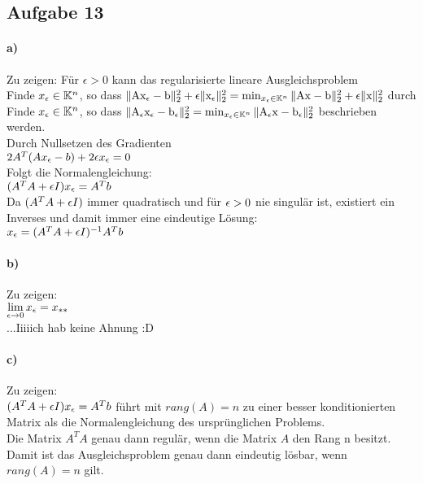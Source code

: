 \subsection*{Aufgabe 13}

\paragraph*{a)}
Zu zeigen: Für $\epsilon > 0$ kann das regularisierte lineare Ausgleichsproblem\\
\newline
Finde $x_\epsilon \in \mathbb K^n$, so dass $\mathrm{\| Ax_\epsilon - b \|_2^2} + \epsilon\mathrm{\| x_\epsilon \|_2^2} = \min_{x_\epsilon \in \mathbb K^n}\mathrm{\| Ax - b \|_2^2} + \epsilon\mathrm{\| x \|_2^2}$ durch\\
\newline
Finde $x_\epsilon \in \mathbb K^n$, so dass $\mathrm{\| A_\epsilon x_\epsilon - b_\epsilon \|_2^2} = \min_{x_\epsilon \in \mathbb K^n}\mathrm{\| A_\epsilon x - b_\epsilon \|_2^2}$ beschrieben werden.\\
\newline
Durch Nullsetzen des Gradienten\\
$2A^T(Ax_\epsilon-b)+2\epsilon x_\epsilon = 0$\\
Folgt die Normalengleichung:\\
$(A^TA + \epsilon I)x_\epsilon = A^Tb$\\

Da $(A^TA + \epsilon I)$ immer quadratisch und für $\epsilon > 0$ nie singulär ist, existiert ein Inverses und damit immer eine eindeutige Lösung:\\
$x_\epsilon = (A^TA + \epsilon I)^{-1}A^Tb$


\paragraph*{b)}
Zu zeigen:\\
$\lim\limits_{\epsilon \rightarrow 0}{x_\epsilon} = x_{**}$\\
\newline
...Iiiiich hab keine Ahnung :D



\paragraph*{c)}
Zu zeigen:\\
$(A^TA + \epsilon I)x_\epsilon = A^Tb$ führt mit $rang(A) = n$ zu einer besser konditionierten Matrix als die Normalengleichung des ursprünglichen Problems.\\
\newline
Die Matrix $A^TA$ genau dann regulär, wenn die Matrix $A$ den Rang n besitzt. Damit ist das Ausgleichsproblem genau dann eindeutig lösbar, wenn $rang(A) =n$ gilt.
